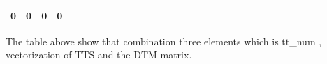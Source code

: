 \documentclass[]{article}
\begin{document}
\begin{longtable}[c]{@{}cccccc@{}}
\begin{minipage}[t]{0.07\columnwidth}\centering\strut
0
\strut\end{minipage} &
\begin{minipage}[t]{0.08\columnwidth}\centering\strut
0
\strut\end{minipage} &
\begin{minipage}[t]{0.14\columnwidth}\centering\strut
0
\strut\end{minipage} &
\begin{minipage}[t]{0.09\columnwidth}\centering\strut
0
\strut\end{minipage}\tabularnewline
\bottomrule
\end{longtable}

The table above show that combination three elements which is tt\_num ,
vectorization of TTS and the DTM matrix.

\renewcommand\refname{References}

\end{document}
